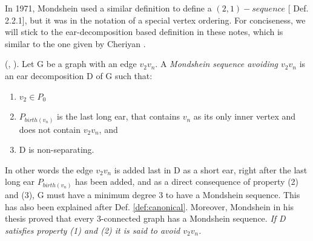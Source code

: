 In 1971, Mondshein used a similar definition to define a $(2,1)-sequence$ [\cite{mond} Def. 2.2.1], but it was in the notation of a special vertex ordering.
For conciseness, we will stick to the ear-decomposition based definition in these notes, which is similar to the one given by Cheriyan \cite{cheriyan}.

\begin{defn}\label{def:mond}
(\cite{mond}, \cite{cheriyan}). Let G be a graph with an edge $v_2v_n$. A \textit{Mondshein sequence avoiding $v_2v_n$} is an ear decomposition D of G such that:
\begin{enumerate}
\item $v_2 \in P_0$
\item $P_{birth(v_n)}$ is the last long ear, that contains $v_n$ as its only inner vertex and does not contain $v_2v_n$, and
\item D is non-separating.
\end{enumerate}
\end{defn}

In other words the edge $v_2v_n$ is added last in D as a short ear, right after the last long ear $P_{birth(v_n)}$ has been added, and as a direct consequence of property (2) and (3), 
G must have a minimum degree 3 to have a Mondshein sequence.
This has also been explained after Def. \ref{def:canonical}.
Moreover, Mondshein in his thesis \cite{mond} proved that every 3-connected graph has a Mondshein sequence.
\textit{If D satisfies property (1) and (2) it is said to avoid $v_2v_n$.}
